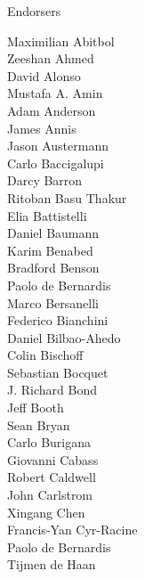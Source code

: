 \documentclass[PICOAPC.tex]{subfiles}
\begin{document}
\vskip -7pt

\large { \centerline {Endorsers}}

%
\setlength{\columnsep}{7pt}
\footnotesize {
\begin{multicols}{4}
Maximilian Abitbol              \\
Zeeshan Ahmed                   \\
David Alonso                    \\
Mustafa A. Amin                 \\
Adam Anderson                   \\
James Annis                     \\
Jason Austermann                \\
Carlo Baccigalupi               \\
Darcy Barron                    \\
Ritoban Basu Thakur             \\
Elia Battistelli                \\
Daniel Baumann                  \\
Karim Benabed                   \\
Bradford Benson                 \\
Paolo de Bernardis              \\
Marco Bersanelli                \\
Federico Bianchini              \\
Daniel Bilbao-Ahedo             \\
Colin Bischoff                  \\
Sebastian Bocquet               \\
J. Richard Bond                 \\
Jeff Booth                      \\
Sean Bryan                      \\
Carlo Burigana                  \\
Giovanni Cabass                 \\
Robert Caldwell                 \\
John Carlstrom                  \\
Xingang Chen                    \\
Francis-Yan Cyr-Racine          \\
Paolo de Bernardis              \\
Tijmen de Haan                  \\

\end{multicols}}
\end{document}
